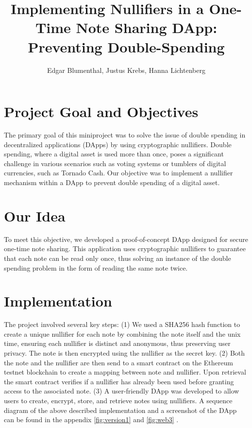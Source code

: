 \documentclass[twocolumn,10pt]{article}
\title{Implementing Nullifiers in a One-Time Note Sharing DApp: Preventing Double-Spending}
\author{Edgar Blumenthal, Justus Krebs, Hanna Lichtenberg}
\date{}
\begin{document}
\maketitle

\section*{Project Goal and Objectives}
The primary goal of this miniproject was to solve the issue of double spending in decentralized applications (DApps) by using cryptographic nullifiers. Double spending, where a digital asset is used more than once, poses a significant challenge in various scenarios such as voting systems or tumblers of digital currencies, such as Tornado Cash. Our objective was to implement a nullifier mechanism within a DApp to prevent double spending of a digital asset.

\section*{Our Idea}
To meet this objective, we developed a proof-of-concept DApp designed for secure one-time note sharing. This application uses cryptographic nullifiers to guarantee that each note can be read only once, thus solving an instance of the double spending problem in the form of reading the same note twice.

\section*{Implementation}
The project involved several key steps: (1) We used a SHA256 hash function to create a unique nullifier for each note by combining the note itself and the unix time, ensuring each nullifier is distinct and anonymous, thus preserving user privacy. The note is then encrypted using the nullifier as the secret key. (2) Both the note and the nullifier are then send to a smart contract on the Ethereum testnet blockchain to create a mapping between note and nullifier. Upon retrieval the smart contract verifies if a nullifier has already been used before granting access to the associated note. (3) A user-friendly DApp was developed to allow users to create, encrypt, store, and retrieve notes using nullifiers. A sequence diagram of the above described implementation and a screenshot of the DApp can be found in the appendix \ref{fig:version1} and \ref{fig:web3} .
\end{document}
